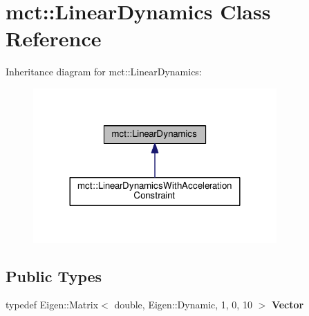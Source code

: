 \hypertarget{classmct_1_1LinearDynamics}{}\section{mct\+:\+:Linear\+Dynamics Class Reference}
\label{classmct_1_1LinearDynamics}


Inheritance diagram for mct\+:\+:Linear\+Dynamics\+:
\nopagebreak
\begin{figure}[H]
\begin{center}
\leavevmode
\includegraphics[width=264pt]{classmct_1_1LinearDynamics__inherit__graph}
\end{center}
\end{figure}
\subsection*{Public Types}
\begin{DoxyCompactItemize}
\item 
typedef Eigen\+::\+Matrix$<$ double, Eigen\+::\+Dynamic, 1, 0, 10 $>$ {\bfseries Vector}\hypertarget{classmct_1_1LinearDynamics_abd48cad5a3b6819e218cde41ec2670a0}{}\label{classmct_1_1LinearDynamics_abd48cad5a3b6819e218cde41ec2670a0}

\end{DoxyCompactItemize}
